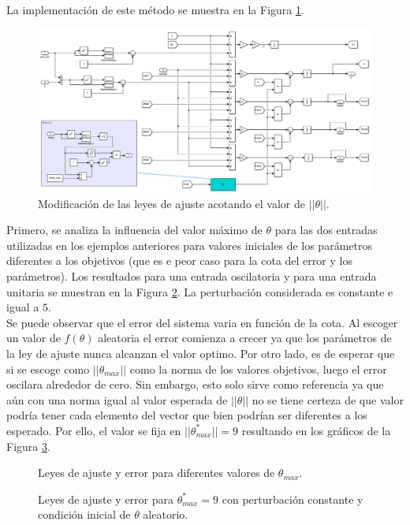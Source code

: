 \documentclass[letterpaper,11pt]{article} %
\begin{document}
La implementación de este método se muestra en la Figura \ref{thetamax}.
\begin{figure}
	\centering
	\includegraphics[width=14cm]{thetamax.png}
	\caption{Modificación de las leyes de ajuste acotando el valor de $||\theta||$.}
	\label{thetamax}
\end{figure}
Primero, se analiza la influencia del valor máximo de 
$\theta$ para las dos entradas utilizadas en los ejemplos anteriores para valores iniciales de los parámetros diferentes a los objetivos (que es e peor caso para la cota del error y los parámetros). Los resultados para una entrada oscilatoria y para una entrada unitaria se muestran en la Figura \ref{thetavar}. La perturbación considerada es constante e igual a $5$.\\
Se puede observar que el error del sistema varia en función de la cota. Al escoger un valor de $f(\theta)$ aleatoria el error comienza a crecer ya que los parámetros de la ley de ajuste nunca alcanzan el valor optimo. Por otro lado, es de esperar que si se escoge como $||\theta_{max}||$ como la norma de los valores objetivos, luego el error oscilara alrededor de cero. Sin embargo, esto solo sirve como referencia ya que aún con una norma igual al valor esperada de $||\theta||$ no se tiene certeza de que valor podría tener cada elemento del vector que bien podrían ser diferentes a los esperado. Por ello, el valor se fija en $||\theta_{max}^*|| = 9$ resultando en los gráficos de la Figura \ref{thetaopt}.
\newpage
\begin{figure}[h]
	\centering
	\captionsetup{justification=centering}
	\caption{Leyes de ajuste y error para diferentes valores de $\theta_{max}$.}
	\label{thetavar}
\end{figure}
\newpage
\begin{figure}[h]
	\centering
	\captionsetup{justification=centering}
	\caption{Leyes de ajuste y error para $\theta_{max}^* = 9$ con perturbación constante y condición inicial de $\theta$ aleatorio.}
	\label{thetaopt}
\end{figure}
\end{document}
